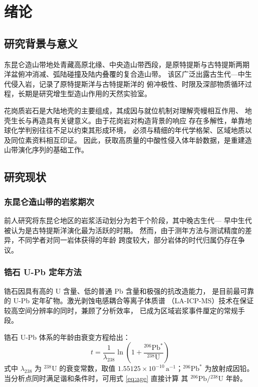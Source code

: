 \documentclass[master]{cugthesis}
\begin{document}
\makefrontpages

\chapter{绪论}

\section{研究背景与意义}

东昆仑造山带地处青藏高原北缘、中央造山带西段，是原特提斯与古特提斯两期
洋盆俯冲消减、弧陆碰撞及陆内叠覆的复合造山带。
该区广泛出露古生代—中生代侵入岩，记录了原特提斯洋与古特提斯洋的
俯冲极性、时限及深部物质循环过程，长期是研究增生型造山作用的天然实验室。

花岗质岩石是大陆地壳的主要组成，其成因与就位机制对理解壳幔相互作用、
地壳生长与再造具有关键意义\citep{wu2007}。由于花岗岩对构造背景的响应
存在多解性，单靠地球化学判别往往不足以约束其形成环境，
必须与精细的年代学格架、区域地质以及同位素资料相互印证。
因此，获取高质量的中酸性侵入体年龄数据，是重建造山带演化序列的基础工作。

\section{研究现状}

\subsection{东昆仑造山带的岩浆期次}

前人研究将东昆仑地区的岩浆活动划分为若干个阶段，其中晚古生代—
早中生代被认为是古特提斯洋演化最为活跃的时期。
然而，由于测年方法与测试精度的差异，不同学者对同一岩体获得的年龄
跨度较大，部分岩体的时代归属仍存在争议。

\subsection{锆石 U-Pb 定年方法}

锆石因具有高的 U 含量、低的普通 Pb 含量和极强的抗改造能力，
是目前最可靠的 U-Pb 定年矿物。激光剥蚀电感耦合等离子体质谱
（LA-ICP-MS）技术在保证较高空间分辨率的同时，兼顾了分析效率，
已成为区域岩浆事件厘定的常规手段\citep{paton2011}。

锆石 U-Pb 体系的年龄由衰变方程给出：
\begin{equation}
    t=\frac{1}{\lambda_{238}}\ln\left(1+\frac{{}^{206}\mathrm{Pb}^{*}}{{}^{238}\mathrm{U}}\right)
    \label{eq:age}
\end{equation}
式中 $\lambda_{238}$ 为 ${}^{238}\mathrm{U}$ 的衰变常数，取值
$1.55125\times10^{-10}\,\mathrm{a}^{-1}$；${}^{206}\mathrm{Pb}^{*}$
为放射成因铅。当分析点同时满足谐和条件时，可用式 \eqref{eq:age} 直接计算
其 ${}^{206}\mathrm{Pb}/{}^{238}\mathrm{U}$ 年龄。
\end{document}
